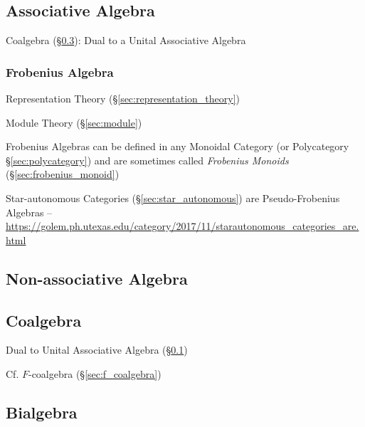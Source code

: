 \subsection{Associative Algebra}\label{sec:associative_algebra}

Coalgebra (\S\ref{sec:coalgebra}): Dual to a Unital Associative
Algebra



\subsubsection{Frobenius Algebra}\label{sec:frobenius_algebra}

Representation Theory (\S\ref{sec:representation_theory})

Module Theory (\S\ref{sec:module})

Frobenius Algebras can be defined in any Monoidal Category (or
Polycategory \S\ref{sec:polycategory}) and are sometimes called
\emph{Frobenius Monoids} (\S\ref{sec:frobenius_monoid})

Star-autonomous Categories (\S\ref{sec:star_autonomous}) are Pseudo-Frobenius
Algebras
--\url{https://golem.ph.utexas.edu/category/2017/11/starautonomous_categories_are.html}



\subsection{Non-associative Algebra}
\label{sec:nonassociative_algebra}

\subsection{Coalgebra}\label{sec:coalgebra}

Dual to Unital Associative Algebra (\S\ref{sec:associative_algebra})

Cf. $F$-coalgebra (\S\ref{sec:f_coalgebra})



\subsection{Bialgebra}\label{sec:bialgebra}

